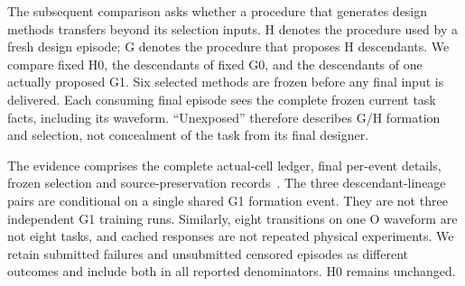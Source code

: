 \documentclass[10pt]{article}
\begin{document}
The subsequent comparison asks whether a procedure that generates design
methods transfers beyond its selection inputs. H denotes the procedure used
by a fresh design episode; G denotes the procedure that proposes H descendants.
We compare fixed H0, the descendants of fixed G0, and the descendants of one
actually proposed G1. Six selected methods are frozen before any final input
is delivered. Each consuming final episode sees the complete frozen current
task facts, including its waveform. ``Unexposed'' therefore describes G/H
formation and selection, not concealment of the task from its final designer.

The evidence comprises the complete actual-cell ledger, final per-event details,
frozen selection and source-preservation records~\cite{actual,details,selection,preservation}.
The three descendant-lineage pairs are conditional on a single shared G1
formation event. They are not three independent G1 training runs. Similarly,
eight transitions on one O waveform are not eight tasks, and cached responses
are not repeated physical experiments. We retain submitted failures and
unsubmitted censored episodes as different outcomes and include both in all
reported denominators. H0 remains unchanged.


\end{document}
